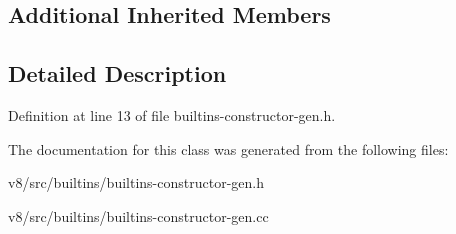\subsection*{Additional Inherited Members}


\subsection{Detailed Description}


Definition at line 13 of file builtins-\/constructor-\/gen.\+h.



The documentation for this class was generated from the following files\+:\begin{DoxyCompactItemize}
\item 
v8/src/builtins/builtins-\/constructor-\/gen.\+h\item 
v8/src/builtins/builtins-\/constructor-\/gen.\+cc\end{DoxyCompactItemize}
